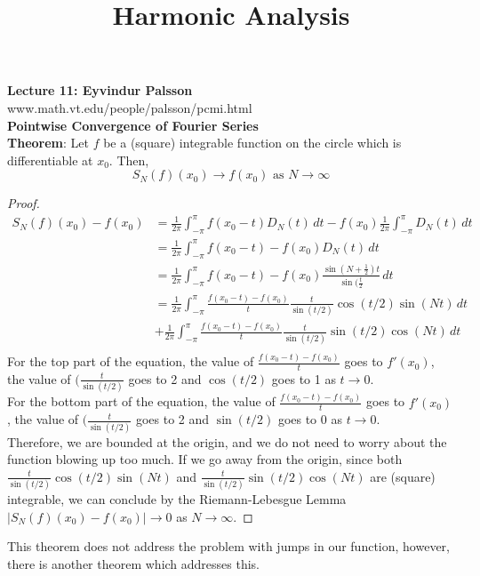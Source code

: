\documentclass[12pt]{article}
\title{Harmonic Analysis}
\begin{document}
\noindent \textbf{Lecture 11: Eyvindur Palsson} \\
\noindent www.math.vt.edu/people/palsson/pcmi.html \\

\noindent \textbf{Pointwise Convergence of Fourier Series} \\
\noindent \textbf{Theorem}: Let $f$ be a (square) integrable function on the circle which is differentiable at $x_0$. Then,
$$ S_N(f)(x_0) \rightarrow f(x_0) \text{ as } N \rightarrow \infty$$
\begin{proof}
\begin{align*}
S_N(f)(x_0) - f(x_0) &= \frac{1}{2\pi} \int^\pi_{-\pi} f(x_0 - t) D_N(t) \, dt - f(x_0) \frac{1}{2\pi} \int^\pi_{-\pi} D_N(t) \, dt \\
&= \frac{1}{2\pi} \int^\pi_{-\pi} f(x_0 - t) - f(x_0) D_N(t) \, dt \\
&= \frac{1}{2\pi} \int^\pi_{-\pi} f(x_0 - t) - f(x_0) \frac{\sin(N+\frac{1}{2})t}{\sin(\frac{t}{2}} \, dt \\
&= \frac{1}{2\pi} \int^\pi_{-\pi} \frac{f(x_0 - t) - f(x_0)}{t}\frac{t}{\sin(t/2)} \cos (t/2)\sin(Nt)  \, dt \\
&+ \frac{1}{2\pi} \int^\pi_{-\pi} \frac{f(x_0 - t) - f(x_0)}{t}\frac{t}{\sin(t/2)} \sin(t/2)\cos(Nt)  \, dt \\
\end{align*}
\noindent For the top part of the equation, the value of $\frac{f(x_0 - t) - f(x_0)}{t}$ goes to $f'(x_0)$, the value of $(\frac{t}{\sin(t/2)}$ goes to 2 and $\cos(t/2)$ goes to 1 as $t \rightarrow 0$.  \\

\noindent For the bottom part of the equation, the value of $\frac{f(x_0 - t) - f(x_0)}{t}$ goes to $f'(x_0)$, the value of $(\frac{t}{\sin(t/2)}$ goes to 2 and $\sin(t/2)$ goes to 0 as $t \rightarrow 0$.  \\

\noindent Therefore, we are bounded at the origin, and we do not need to worry about the function blowing up too much. If we go away from the origin, since both $\frac{t}{\sin(t/2)} \cos (t/2)\sin(Nt)$ and $\frac{t}{\sin(t/2)} \sin(t/2)\cos(Nt)$ are (square) integrable, we can conclude by the Riemann-Lebesgue Lemma $\vert S_N(f)(x_0) - f(x_0) \vert \rightarrow 0$ as $N \rightarrow \infty$.
\end{proof}

\noindent This theorem does not address the problem with jumps in our function, however, there is another theorem which addresses this. \\
\end{document}
